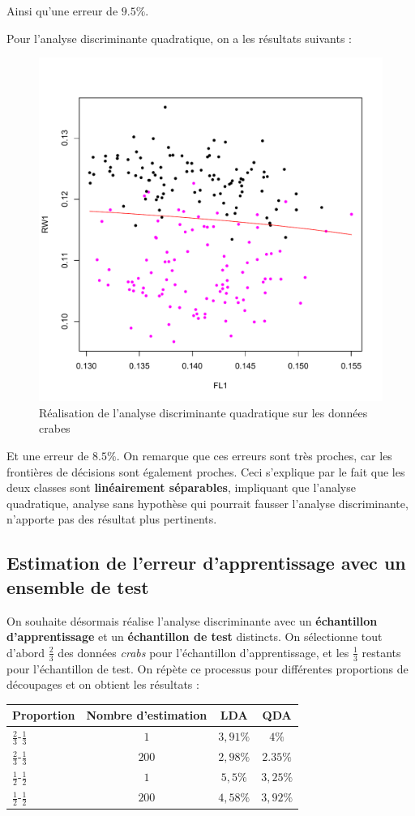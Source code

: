 \documentclass[a4paper,11pt]{article}
\begin{document}
\noindent Ainsi qu'une erreur de $9.5 \%$. 

\noindent Pour l'analyse discriminante quadratique, on a les résultats suivants : 

\begin{figure}[H]
\begin{center}
\includegraphics[width=.6\textwidth]{img/qda}
\caption{Réalisation de l'analyse discriminante quadratique sur les données crabes}
\end{center}
\end{figure}

\noindent Et une erreur de $8.5 \%$. On remarque que ces erreurs sont très proches, car les frontières de décisions sont également proches. Ceci s'explique par le fait que les deux classes sont \textbf{linéairement séparables}, impliquant que l'analyse quadratique, analyse sans hypothèse qui pourrait fausser l'analyse discriminante, n'apporte pas des résultat plus pertinents.

\subsection{Estimation de l'erreur d'apprentissage avec un ensemble de test}

\noindent On souhaite désormais réalise l'analyse discriminante avec un \textbf{échantillon d'apprentissage} et un \textbf{échantillon de test} distincts. On sélectionne tout d'abord $\frac{2}{3}$ des données \textit{crabs} pour l'échantillon d'apprentissage, et les $\frac{1}{3}$ restants pour l'échantillon de test. On répète ce processus pour différentes proportions de découpages et on obtient les résultats : 

\begin{center}
\begin{tabular}{|l|c|c|c|}
\hline
Proportion & Nombre d'estimation & LDA & QDA  \\ 
\hline
$\frac{2}{3}$-$\frac{1}{3}$& $1$ & $3,91\%$ & $4\%$ \\
$\frac{2}{3}$-$\frac{1}{3}$& $200$ & $2,98\%$  & $2.35\%$\\
$\frac{1}{2}$-$\frac{1}{2}$& $1$ & $5,5\%$ & $3,25\%$ \\ 
$\frac{1}{2}$-$\frac{1}{2}$& $200$ & $4,58\%$ & $3,92\%$ \\ 
\hline
\end{tabular}
\end{center}
\\ \\
\end{document}
